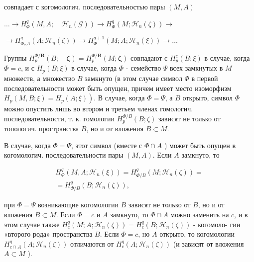 \documentclass[10pt]{article}
\begin{document}
совпадает с когомологич. последовательностью пары $(M, A)$



$\ldots \longrightarrow H_{\Phi}^{q}\left(M, A ; \quad \mathscr{H}_{n}(\mathscr{G})\right) \rightarrow H_{\Phi}^{q}\left(M ; \mathscr{H}_{n}(\zeta)\right) \longrightarrow$



$\longrightarrow H_{\Phi_{\cap} A}^{q}\left(A ; \mathscr{H}_{n}(\mathscr{\zeta})\right) \longrightarrow H_{\Phi}^{q+1}\left(M ; A ; \mathscr{H}_{n}(\xi)\right) \longrightarrow \ldots$



Группы $H_{p}^{\Phi / \boldsymbol{B}}(B ; \quad \boldsymbol{\zeta})=H_{p}^{\Phi / \boldsymbol{B}}(M ; \boldsymbol{\zeta})$ совпадают с $H_{p}^{c}(B ; \xi)$ в случае, когда $\Phi=c$, и с $H_{p}(B ; \xi)$ в случае, когда $\Phi$ - семейство $\Psi$ всех замкнутых в $M$ множеств, а множество $B$ замкнуто (в этом случае символ $\Phi$ в первой последовательности может быть опущен, причем имеет место изоморфизм $\left.H_{p}(M, B ; \xi)=H_{p}(A ; \xi)\right)$. В случае, когда $\Phi=\Psi$, а $B$ открыто, символ $\Phi$ можно опустить лишь во втором и третьем членах гомологич. последовательности, т. к. гомологии $H_{p}^{\Phi / B}(B ; \zeta)$ зависят не только от топологич. пространства $B$, но и от вложения $B \subset M$.



В случае, когда $\Phi=\Psi$, этот символ (вместе с $\Phi \cap A$ ) может быть опущен в когомологич. последовательности пары $(M, A)$. Если $A$ замкнуто, то



\[

\begin{gathered}

H_{\Phi}^{q}\left(M, A ; \mathscr{H}_{n}(\xi)\right)=H_{\Phi / B}^{q}\left(M ; \mathscr{H}_{n}(\zeta)\right)= \\

=H_{\Phi / B}^{q}\left(B ; \mathscr{H}_{n}(\zeta)\right),

\end{gathered}

\]



при $\Phi=\Psi$ возникающие когомологии $B$ зависят не только от $B$, но и от вложения $B \subset M$. Если $\Phi=c$ и $A$ замкнуто, то $\Phi \cap A$ можно заменить на $c$, и в этом случае также $H_{c}^{q}\left(M ; A ; \mathscr{H}_{n}(\zeta)\right)=H_{c}^{q}\left(B ; \mathscr{H}_{n}(\zeta)\right)$ - когомоло- гии «второго рода» пространства $B$. Если $\Phi=c$, но $A$ открыто, то когомологии $H_{c \cap A}^{q}\left(A ; \mathscr{H}_{n}(\zeta)\right)$ отличаются от $H_{c}^{q}\left(A ; \mathscr{H}_{n}(\zeta)\right)$ (и зависят от вложения $A \subset M$ ).
\end{document}
